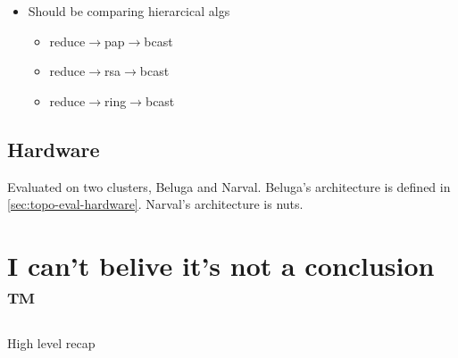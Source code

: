 \begin{itemize}
    \item Should be comparing hierarcical algs
    \begin{itemize}
        \item reduce$\rightarrow$pap$\rightarrow$bcast
        \item reduce$\rightarrow$rsa$\rightarrow$bcast
        \item reduce$\rightarrow$ring$\rightarrow$bcast
    \end{itemize}
\end{itemize}

\lstset{label = lst:mif_ar_microbmark}
\lstset{caption = MIF microbenchmark}


\subsection{Hardware}
Evaluated on two clusters, Beluga and Narval.
Beluga's architecture is defined in \ref{sec:topo-eval-hardware}.
Narval's architecture is nuts.

\section{I can't belive it's not a conclusion ™}
High level recap

